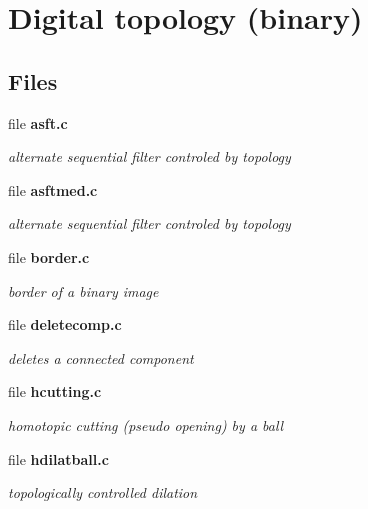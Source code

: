 \section{Digital topology (binary)}
\label{group__topobin}
\subsection*{Files}
\begin{CompactItemize}
\item 
file {\bf asft.c}
\begin{CompactList}\small\item\em alternate sequential filter controled by topology \item\end{CompactList}

\item 
file {\bf asftmed.c}
\begin{CompactList}\small\item\em alternate sequential filter controled by topology \item\end{CompactList}

\item 
file {\bf border.c}
\begin{CompactList}\small\item\em border of a binary image \item\end{CompactList}

\item 
file {\bf deletecomp.c}
\begin{CompactList}\small\item\em deletes a connected component \item\end{CompactList}

\item 
file {\bf hcutting.c}
\begin{CompactList}\small\item\em homotopic cutting (pseudo opening) by a ball \item\end{CompactList}

\item 
file {\bf hdilatball.c}
\begin{CompactList}\small\item\em topologically controlled dilation \item\end{CompactList}


\end{CompactItemize}
